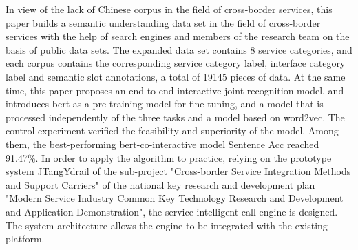 \begin{englishabstract}
In view of the lack of Chinese corpus in the field of cross-border services, this paper builds a semantic understanding data set in the 
field of cross-border services with the help of search engines and members of the research team on the basis of public data sets. 
The expanded data set contains 8 service categories, and each corpus contains the corresponding service category label, interface category label 
and semantic slot annotations, a total of 19145 pieces of data. At the same time, this paper proposes an end-to-end interactive joint recognition model, 
and introduces bert as a pre-training model for fine-tuning, and a model that is processed independently of the three tasks and a model based on word2vec. 
The control experiment verified the feasibility and superiority of the model. Among them, 
the best-performing bert-co-interactive model Sentence Acc reached 91.47\%. In order to apply the algorithm to practice, 
relying on the prototype system JTangYdrail of the sub-project "Cross-border Service Integration Methods and Support Carriers" 
of the national key research and development plan "Modern Service Industry Common Key Technology Research and Development and Application Demonstration", 
the service intelligent call engine is designed. The system architecture allows the engine to be integrated with the existing platform.

\end{englishabstract}
